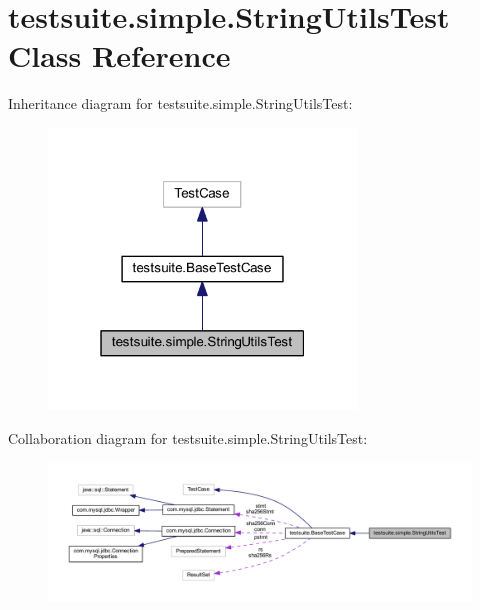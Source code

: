 \hypertarget{classtestsuite_1_1simple_1_1_string_utils_test}{}\section{testsuite.\+simple.\+String\+Utils\+Test Class Reference}
\label{classtestsuite_1_1simple_1_1_string_utils_test}


Inheritance diagram for testsuite.\+simple.\+String\+Utils\+Test\+:
\nopagebreak
\begin{figure}[H]
\begin{center}
\leavevmode
\includegraphics[width=232pt]{classtestsuite_1_1simple_1_1_string_utils_test__inherit__graph}
\end{center}
\end{figure}


Collaboration diagram for testsuite.\+simple.\+String\+Utils\+Test\+:
\nopagebreak
\begin{figure}[H]
\begin{center}
\leavevmode
\includegraphics[width=350pt]{classtestsuite_1_1simple_1_1_string_utils_test__coll__graph}
\end{center}
\end{figure}
